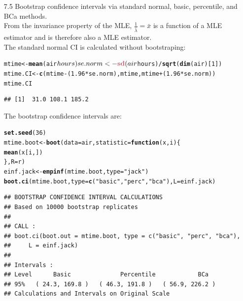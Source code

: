 \documentclass{article}\usepackage[]{graphicx}\usepackage[]{color}
\makeatletter
\newcommand{\hlstr}[1]{\textcolor[rgb]{0.192,0.494,0.8}{#1}}%
\newcommand{\hlkwd}[1]{\textcolor[rgb]{0.737,0.353,0.396}{\textbf{#1}}}%
\newenvironment{kframe}{%
 \def\at@end@of@kframe{}%
 \ifinner\ifhmode%
  \def\at@end@of@kframe{\end{minipage}}%
  \begin{minipage}{\columnwidth}%
 \fi\fi%
 \def\FrameCommand##1{\hskip\@totalleftmargin \hskip-\fboxsep
 \colorbox{shadecolor}{##1}\hskip-\fboxsep
     \hskip-\linewidth \hskip-\@totalleftmargin \hskip\columnwidth}%
 \MakeFramed {\advance\hsize-\width
   \@totalleftmargin\z@ \linewidth\hsize
   \@setminipage}}%
 {\par\unskip\endMakeFramed%
 \at@end@of@kframe}
\newenvironment{knitrout}{}{} %
\makeatother
\begin{document}
\begin{itemize}
\item[7.5] Bootstrap confidence intervals via standard normal, basic, percentile, and BCa methods.\\
From the invariance property of the MLE, $\frac{1}{\hat{\lambda}}=\bar{x}$ is a function of a MLE estimator and is therefore also a MLE estimator.\\  
The standard normal CI is calculated without bootstraping:\\
\begin{knitrout}
\color{fgcolor}\begin{kframe}
\begin{alltt}
mtime <- \hlkwd{mean}(air$hours)
se.norm <- \hlkwd{sd}(air$hours)/\hlkwd{sqrt}(\hlkwd{dim}(air)[1])
mtime.CI <- \hlkwd{c}(mtime - (1.96 * se.norm), mtime, mtime + (1.96 * se.norm))
mtime.CI
\end{alltt}
\begin{verbatim}
## [1]  31.0 108.1 185.2
\end{verbatim}
\end{kframe}
\end{knitrout}

The bootstrap confidence intervals are:
\begin{knitrout}
\color{fgcolor}\begin{kframe}
\begin{alltt}
\hlkwd{set.seed}(36)
mtime.boot <- \hlkwd{boot}(data = air, statistic = \hlkwd{function}(x, i) \{
    \hlkwd{mean}(x[i, ])
\}, R = r)
einf.jack <- \hlkwd{empinf}(mtime.boot, type = \hlstr{"jack"})
\hlkwd{boot.ci}(mtime.boot, type = \hlkwd{c}(\hlstr{"basic"}, \hlstr{"perc"}, \hlstr{"bca"}), L = einf.jack)
\end{alltt}
\begin{verbatim}
## BOOTSTRAP CONFIDENCE INTERVAL CALCULATIONS
## Based on 10000 bootstrap replicates
## 
## CALL : 
## boot.ci(boot.out = mtime.boot, type = c("basic", "perc", "bca"), 
##     L = einf.jack)
## 
## Intervals : 
## Level      Basic              Percentile            BCa          
## 95%   ( 24.3, 169.8 )   ( 46.3, 191.8 )   ( 56.9, 226.2 )  
## Calculations and Intervals on Original Scale
\end{verbatim}
\end{kframe}
\end{knitrout}


\end{itemize}
\end{document}
